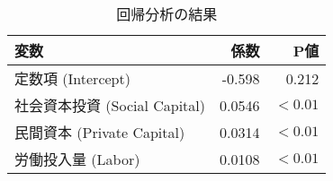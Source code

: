 \begin{table}[h!]
  \centering
  \renewcommand{\arraystretch}{1.2}
  \begin{tabular}{lrr}
  \toprule
  \textbf{変数}                    & \textbf{係数} & \textbf{P値} \\
  \midrule
  定数項 (Intercept)              & -0.598        & 0.212 \\
  社会資本投資 (Social Capital)    & 0.0546        & $<0.01$ \\
  民間資本 (Private Capital)       & 0.0314        & $<0.01$ \\
  労働投入量 (Labor)               & 0.0108        & $<0.01$ \\
  \bottomrule
  \end{tabular}
  \caption{回帰分析の結果}
  \label{tab:regression_results}
  \end{table}
  